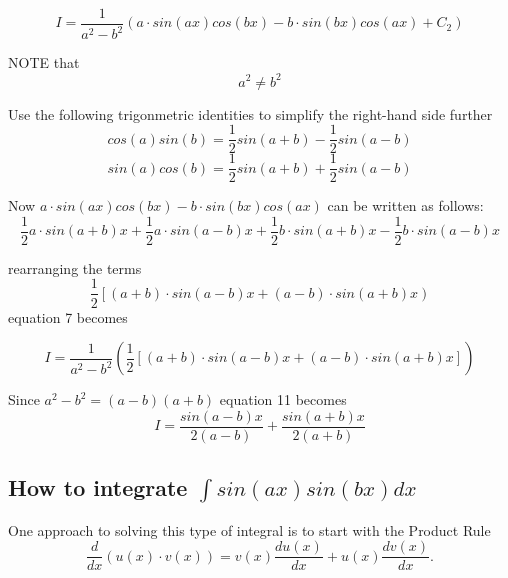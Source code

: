 \documentclass[11pt]{article}
\begin{document}
\begin{equation}
I = \frac{1}{a^2-b^2} \left(a \cdot sin(ax) cos(bx) - b \cdot sin(bx) cos(ax) + C_2 \right)
\label{eq:eq7} \tag{7}
\end{equation}

NOTE that \[{a^2} \neq {b^2}\]

Use the following trigonmetric identities to simplify the right-hand
side further \begin{equation}
cos(a)sin(b) = \frac{1}{2}sin(a+b) - \frac{1}{2}sin(a-b)
\label{eq:eq8} \tag{8}
\end{equation} \begin{equation}
sin(a)cos(b) = \frac{1}{2}sin(a+b) + \frac{1}{2}sin(a-b)
\label{eq:eq9} \tag{9}
\end{equation}

Now \(a \cdot sin(ax) cos(bx) - b \cdot sin(bx) cos(ax)\) can be written
as follows:
\[\frac{1}{2} a \cdot sin(a+b)x + \frac{1}{2}a \cdot sin(a-b)x +\frac{1}{2}b \cdot sin(a+b)x - \frac{1}{2}b \cdot sin(a-b)x\]

rearranging the terms \begin{equation}
\frac{1}{2} \left[(a+b) \cdot sin(a-b)x + (a-b) \cdot sin(a+b)x \right)
\label{eq:eq10} \tag{10}
\end{equation} equation 7 becomes

\begin{equation}
I = \frac{1}{a^2 - b^2} \left(\frac{1}{2} \left[(a+b) \cdot sin(a-b)x + (a-b) \cdot sin(a+b)x \right] \right)
\label{eq:eq11} \tag{11}
\end{equation}

Since \({a^2} - {b^2} = (a-b)(a+b)\) equation 11 becomes
\begin{equation}
I = \frac{sin(a-b)x}{2(a-b)} + \frac{sin(a+b)x}{2(a+b)}
\label{eq:eq12} \tag{12}
\end{equation}

    \hypertarget{how-to-integrate-int-sinaxsinbx-dx}{%
\subsection{\texorpdfstring{How to integrate
\(\int sin(ax)sin(bx) dx\)}{How to integrate \textbackslash int sin(ax)sin(bx) dx}}\label{how-to-integrate-int-sinaxsinbx-dx}}

    One approach to solving this type of integral is to start with the
Product Rule
\[\frac {d}{dx} (u(x) \cdot v(x)) = v(x) \frac {du(x)}{dx} + u(x) \frac {dv(x)}{dx} .\]
\end{document}
